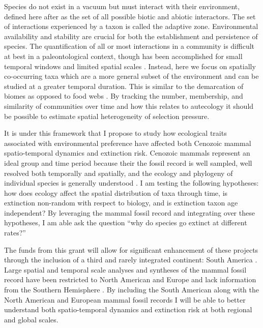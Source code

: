 \documentclass[11pt,letterpaper]{article}
\begin{document}
Species do not exist in a vacuum but must interact with their environment, defined here after \citet{Simpson1944} as the set of all possible biotic and abiotic interactors. The set of interactions experienced by a taxon is called the adaptive zone. Environmental availability and stability are crucial for both the establishment and persistence of species. The quantification of all or most interactions in a community is difficult at best in a paleontological context, though has been accomplished for small temporal windows and limited spatial scales \citep{Angielczyk2005,Mitchell2012,Roopnarine2007}. Instead, here we focus on spatially co-occurring taxa which are a more general subset of the environment and can be studied at a greater temporal duration. This is similar to the demarcation of biomes as opposed to food webs \citep{Vilhena2013b}. By tracking the number, membership, and similarity of communities over time and how this relates to autecology it should be possible to estimate spatial heterogeneity of selection pressure.

It is under this framework that I propose to study how ecological traits associated with environmental preference have affected both Cenozoic mammal spatio-temporal dynamics and extinction risk. Cenozoic mammals represent an ideal group and time period because their the fossil record is well sampled, well resolved both temporally and spatially, and the ecology and phylogeny of individual species is generally understood \citep{Alroy2009,Alroy2000g,Jernvall2002,Liow2008,Smith2004}. I am testing the following hypotheses: how does ecology affect the spatial distribution of taxa through time, is extinction non-random with respect to biology, and is extinction taxon age independent? By leveraging the mammal fossil record and integrating over these hypotheses, I am able ask the question ``why do species go extinct at different rates?''

The funds from this grant will allow for significant enhancement of these projects through the inclusion of a third and rarely integrated continent: South America \citep{Stromberg2013,Marshall1982}. Large spatial and temporal scale analyses and syntheses of the mammal fossil record have been restricted to North American and Europe and lack information from the Southern Hemisphere \citep{Jernvall2004,Jernvall2002,Fortelius2002,Janis2000,Alroy1996a,Alroy1998,Alroy2000g,Liow2008,Raia2006,Tomiya2013}. By including the South American along with the North American and European mammal fossil records I will be able to better understand both spatio-temporal dynamics and extinction risk at both regional and global scales. 
\end{document}
